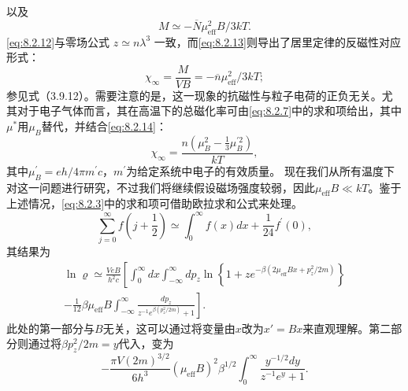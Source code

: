 以及
\begin{equation}\tag{8.2.13}\label{eq:8.2.13}
M \simeq - \overline { { N } } \mu _ { \mathrm { e f f } } ^{2} B / 3 k T .
\end{equation}
\autoref{eq:8.2.12}与零场公式 \(z \simeq n\lambda^{3}\) 一致，而\autoref{eq:8.2.13}则导出了居里定律的反磁性对应形式：
\begin{equation}\tag{8.2.14}\label{eq:8.2.14}
\chi _ { \infty } = \frac { M } { V B } = - \overline { { n } } \mu _ { \mathrm { e f f } } ^{2} / 3 k T ;
\end{equation}
参见式（3.9.12）。需要注意的是，这一现象的抗磁性与粒子电荷的正负无关。尤其对于电子气体而言，其在高温下的总磁化率可由\autoref{eq:8.2.7}中的求和项给出，其中\(\mu^{*}\)用\(\mu_{B}\)替代，并结合\autoref{eq:8.2.14}：
\begin{equation}\tag{8.2.15}\label{eq:8.2.15}
\chi _ { \infty } = \frac { n \left( \mu _ { B } ^{2} - \frac { 1 } { 3 } \mu _ { B } ^{\prime 2} \right) } { k T } ,
\end{equation}
其中\(\mu_{B}^{\prime}=eh/4\pi m^{\prime}c\)，\(m^{\prime}\)为给定系统中电子的有效质量。
现在我们从所有温度下对这一问题进行研究，不过我们将继续假设磁场强度较弱，因此\(\mu_{\mathrm{eff}}B\ll kT\)。鉴于上述情况，\autoref{eq:8.2.3}中的求和项可借助欧拉求和公式来处理。
\begin{equation}\tag{8.2.16}\label{eq:8.2.16}
\sum _ { j = 0 } ^{\infty} f \left( j + \frac { 1 } { 2 } \right) \simeq \int _ { 0 } ^{\infty} f ( x ) d x + \frac { 1 } { 24 } f ^{\prime} ( 0 ) ,
\end{equation}
其结果为
\begin{equation}\tag{8.2.17}\label{eq:8.2.17}
\begin{array}{r} { \ln \varrho \simeq \frac { V e B } { h ^{2} c } \left[ \int _ { 0 } ^{\infty} d x \int _ { - \infty } ^{\infty} d p _ { z } \ln \left\{ 1 + z e ^{- \beta ( 2 \mu _ { \mathrm { e f f} } B x + p _ { z } ^{2} / 2 m ) } \right\} \right. } \\{ \left. - \frac { 1 } { 12 } \beta \mu _ { \mathrm { e f f } } B \int _ { - \infty } ^{\infty} \frac { d p _ { z } } { z ^{- 1} e ^{\beta ( p _ { z} ^{2} / 2 m ) } + 1 } \right] . } \end{array}
\end{equation}
此处的第一部分与\(B\)无关，这可以通过将变量由\(x\)改为\(x' = Bx\)来直观理解。第二部分则通过将\(\beta p_z^2/2m = y\)代入，变为
\begin{equation}\tag{8.2.18}\label{eq:8.2.18}
- \frac { \pi V ( 2 m ) ^{3 / 2} } { 6 h ^{3} } ( \mu _ { \mathrm { e f f } } B ) ^{2} \beta ^{1 / 2} \int _ { 0 } ^{\infty} \frac { y ^{- 1 / 2} d y } { z ^{- 1} e ^{y} + 1 } .
\end{equation}
